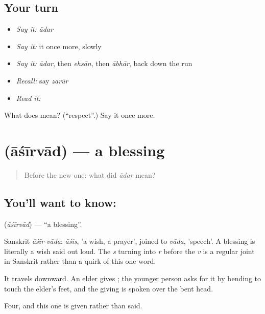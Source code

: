 \subsection*{Your turn}
\begin{itemize}
\raggedright
  \item \emph{Say it:} \emph{ādar}
  \item \emph{Say it:} it once more, slowly
  \item \emph{Say it:} \emph{ādar}, then \emph{ehsān}, then \emph{ābhār}, back down the run
  \item \emph{Recall:} say \emph{zarūr}
  \item \emph{Read it:} \textbf{}
\end{itemize}

\begin{tcolorbox}[breakable,colback=teal!4,colframe=teal!35!black,title={Before you move on}]
What does  mean? (\textquotedblleft{}respect\textquotedblright{}.) Say it once more.
\end{tcolorbox}
\section[\texorpdfstring{\hi{आशीर्वाद} (āśīrvād)}{आशीर्वाद (āśīrvād)}]{ (āśīrvād) — a blessing}

\label{lesson:HI-C50-blessing}



\begin{quote}
Before the new one: what did \emph{ādar} mean?
\end{quote}

\subsection*{You'll want to know: }
\textbf{} (\emph{āśīrvād}) — \textquotedblleft{}a blessing\textquotedblright{}.

Sanskrit \emph{āśīr-vāda}: \emph{āśis}, 'a wish, a prayer', joined to \emph{vāda}, 'speech'. A blessing is literally a wish said out loud. The \emph{s} turning into \emph{r} before the \emph{v} is a regular joint in Sanskrit rather than a quirk of this one word.

It travels downward. An elder gives ; the younger person asks for it by bending to touch the elder's feet, and the giving is spoken over the bent head.

\begin{grammarlens}[title={What you've built}]
Four, and this one is given rather than said.
\end{grammarlens}

